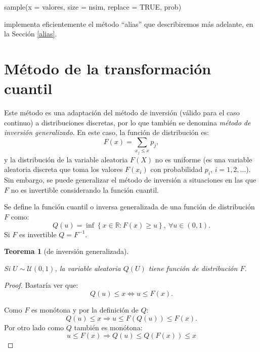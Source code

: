 \documentclass[
  10pt,
]{book}
\newenvironment{Shaded}{\begin{snugshade}}{\end{snugshade}}
\newcommand{\AttributeTok}[1]{\textcolor[rgb]{0.77,0.63,0.00}{#1}}
\newcommand{\ConstantTok}[1]{\textcolor[rgb]{0.00,0.00,0.00}{#1}}
\newcommand{\FunctionTok}[1]{\textcolor[rgb]{0.00,0.00,0.00}{#1}}
\newcommand{\NormalTok}[1]{#1}
\theoremstyle{break}
\newtheorem{theorem}{Teorema}[chapter]
\theoremstyle{nonumberplain}
\newtheorem{proof}{Demostración}
\begin{document}
\begin{Shaded}
\begin{Highlighting}[]
\FunctionTok{sample}\NormalTok{(}\AttributeTok{x =}\NormalTok{ valores, }\AttributeTok{size =}\NormalTok{ nsim, }\AttributeTok{replace =} \ConstantTok{TRUE}\NormalTok{, prob)}
\end{Highlighting}
\end{Shaded}

implementa eficientemente el método ``alias'' que describiremos más adelante, en la Sección \ref{alias}.

\hypertarget{transcuant}{%
\section{Método de la transformación cuantil}\label{transcuant}}

Este método es una adaptación del método de inversión (válido para el caso continuo) a distribuciones discretas, por lo que también se denomina \emph{método de inversión generalizado}.
En este caso, la función de distribución es:
\[F\left( x\right)  =\sum_{x_{j}\leq x}p_{j},\]
y la distribución de la variable aleatoria \(F\left( X\right)\) no es uniforme (es una variable aleatoria discreta que toma los valores \(F\left( x_{i} \right)\) con probabilidad \(p_{i}\), \(i=1,2,\ldots\)).
Sin embargo, se puede generalizar el método de inversión a situaciones en las que \(F\) no es invertible considerando la función cuantil.

Se define la función cuantil o inversa generalizada de una función de distribución \(F\) como:
\[Q\left( u\right) =\inf \left\{ x\in \mathbb{R}:F\left( x\right) \geq
u\right\} ,\ \forall u\in \left( 0,1\right).\]
Si \(F\) es invertible \(Q=F^{-1}\).

\begin{theorem}[de inversión generalizada]
\protect\hypertarget{thm:invgen}{}\label{thm:invgen}

Si \(U\sim \mathcal{U}\left( 0,1\right)\), la variable aleatoria \(Q\left( U\right)\) tiene función de distribución \(F\).
\end{theorem}

\begin{proof}
Bastaría ver que:
\[Q\left( u\right) \leq x \Longleftrightarrow u\leq F(x).\]

Como \(F\) es monótona y por la definición de \(Q\):
\[Q\left( u\right) \leq x \Rightarrow u \leq F(Q\left( u\right)) \leq F(x).\]
Por otro lado como \(Q\) también es monótona:
\[u \leq F(x) \Rightarrow Q\left( u\right) \leq Q(F(x)) \leq x\]
\end{proof}
\end{document}
